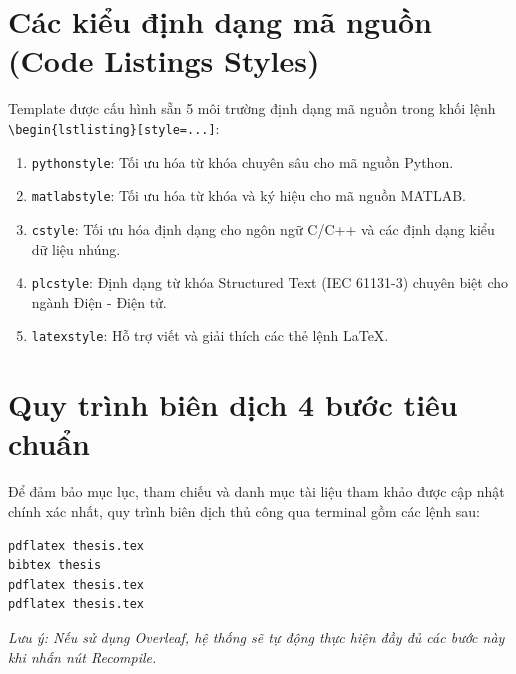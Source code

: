 \section{Các kiểu định dạng mã nguồn (Code Listings Styles)}

Template được cấu hình sẵn 5 môi trường định dạng mã nguồn trong khối lệnh \verb|\begin{lstlisting}[style=...]|:
\begin{enumerate}
  \item \texttt{pythonstyle}: Tối ưu hóa từ khóa chuyên sâu cho mã nguồn Python.
  \item \texttt{matlabstyle}: Tối ưu hóa từ khóa và ký hiệu cho mã nguồn MATLAB.
  \item \texttt{cstyle}: Tối ưu hóa định dạng cho ngôn ngữ C/C++ và các định dạng kiểu dữ liệu nhúng.
  \item \texttt{plcstyle}: Định dạng từ khóa Structured Text (IEC 61131-3) chuyên biệt cho ngành Điện - Điện tử.
  \item \texttt{latexstyle}: Hỗ trợ viết và giải thích các thẻ lệnh LaTeX.
\end{enumerate}

\section{Quy trình biên dịch 4 bước tiêu chuẩn}

Để đảm bảo mục lục, tham chiếu và danh mục tài liệu tham khảo được cập nhật chính xác nhất, quy trình biên dịch thủ công qua terminal gồm các lệnh sau:
\begin{lstlisting}[style=latexstyle, caption={Quy trinh bien dich 4 buoc qua Terminal}]
pdflatex thesis.tex
bibtex thesis
pdflatex thesis.tex
pdflatex thesis.tex
\end{lstlisting}
\textit{Lưu ý: Nếu sử dụng Overleaf, hệ thống sẽ tự động thực hiện đầy đủ các bước này khi nhấn nút Recompile.}
